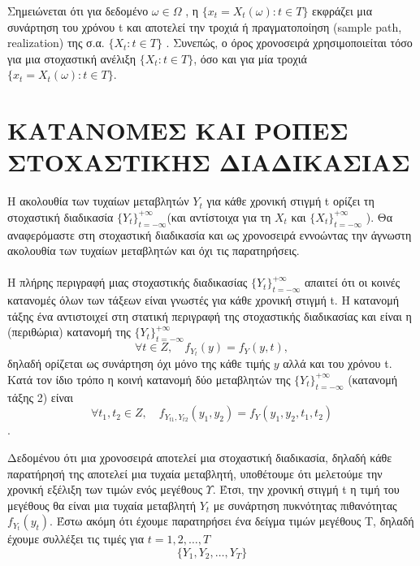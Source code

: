 Σημειώνεται ότι για δεδομένο $\omega \in \Omega$ , η $ \{x_t=X_t\left(\omega\right):t \in T\}$ εκφράζει μια
συνάρτηση του χρόνου t και αποτελεί την τροχιά ή πραγματοποίηση (sample path,
realization) της σ.α. $\{ X_t : t \in T \}$ . Συνεπώς, ο όρος χρονοσειρά
χρησιμοποιείται τόσο για μια στοχαστική ανέλιξη $\{ X_t : t \in T \}$, όσο και για μία
τροχιά $ \{x_t=X_t\left(\omega\right):t \in T\}$.

\section{ΚΑΤΑΝΟΜΕΣ ΚΑΙ ΡΟΠΕΣ ΣΤΟΧΑΣΤΙΚΗΣ ΔΙΑΔΙΚΑΣΙΑΣ }
Η ακολουθία των τυχαίων μεταβλητών $Y_t$ για κάθε χρονική στιγμή t ορίζει τη
στοχαστική διαδικασία $ \{Y_t\}_{t=-\infty}^{+\infty}$(και αντίστοιχα για τη $X_t$ και $ \{X_t\}_{t=-\infty}^{+\infty}$ ). Θα
αναφερόμαστε στη στοχαστική διαδικασία και ως χρονοσειρά εννοώντας την
άγνωστη ακολουθία των τυχαίων μεταβλητών και όχι τις παρατηρήσεις. \\ \\
Η πλήρης περιγραφή μιας στοχαστικής διαδικασίας $\{Y_t\}_{t=-\infty}^{+\infty} $ απαιτεί ότι οι κοινές
κατανομές όλων των τάξεων
 είναι γνωστές για κάθε χρονική στιγμή t.
Η κατανομή τάξης ένα αντιστοιχεί στη στατική περιγραφή της στοχαστικής
διαδικασίας και είναι η (περιθώρια) κατανομή της $\{Y_t\}_{t=-\infty}^{+\infty} $\\
$$ \forall t \in Z, \quad f_{Y_t}\left(y\right)=f_Y\left(y,t\right),$$
δηλαδή ορίζεται ως συνάρτηση όχι μόνο της κάθε τιμής $y$ αλλά και του χρόνου t. Κατά τον ίδιο τρόπο η κοινή κατανομή δύο μεταβλητών της $\{Y_t\}_{t=-\infty}^{+\infty} $ (κατανομή τάξης
2) είναι\\
$$ \forall t_1,t_2 \in Z,\quad f_{Y_{t1},Y_{t2}} \left(y_1,y_2\right)= f_Y\left(y_1,y_2,t_1,t_2\right)$$.






Δεδομένου ότι μια χρονοσειρά αποτελεί μια στοχαστική διαδικασία,
δηλαδή κάθε παρατήρησή της αποτελεί μια τυχαία μεταβλητή,
υποθέτουμε ότι μελετούμε την χρονική εξέλιξη των τιμών ενός μεγέθους $Υ$. Έτσι,
την χρονική στιγμή t η τιμή του μεγέθους θα είναι μια τυχαία μεταβλητή $Y_t$ με
συνάρτηση πυκνότητας πιθανότητας
$f_{Y_t} \left(y_t \right)$. Έστω ακόμη ότι έχουμε παρατηρήσει ένα
δείγμα τιμών μεγέθους Τ, δηλαδή έχουμε συλλέξει τις τιμές για $t = 1, 2,\ldots,T$
$$\{ Y_1,Y_2,\ldots,Y_T \} $$

